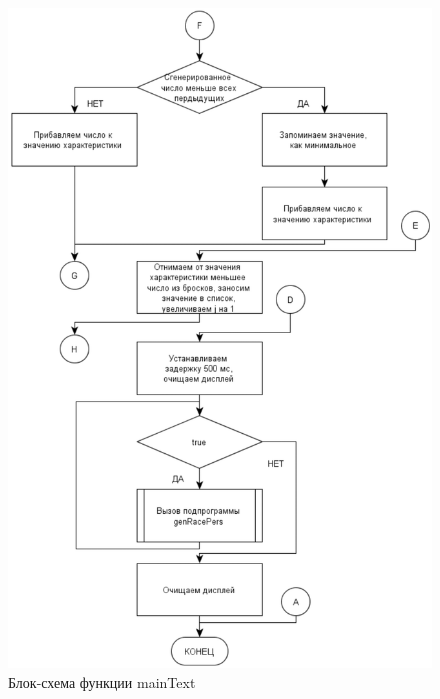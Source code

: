 \documentclass{altsu-report}
\begin{document}
\begin{figure}[H]
    \centering
    \includegraphics[scale=1]{mainText2.png}
    \caption{Блок-схема функции mainText}
    \label{fig:main2}
\end{figure}
\end{document}
